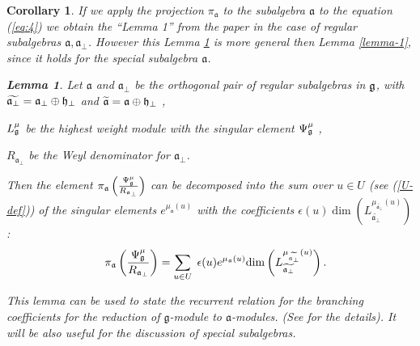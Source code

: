 \documentclass[12pt]{article}
\newtheorem{corollary}{Corollary}[theorem]
\newtheorem{lemma}{Lemma}
\theoremstyle{definition}
\newcommand{\gf}{\mathfrak{g}}
\newcommand{\af}{\mathfrak{a}}
\newcommand{\afb}{\mathfrak{a}_{\bot}}
\begin{document}
\begin{corollary}
  \label{sec:corollary-1}
  If we apply the projection $\pi_{\af}$ to the subalgebra $\af$ to the equation (\ref{eq:4}) we obtain the ``Lemma 1'' from the paper \cite{2010arXiv1007.0318L} in the case of regular subalgebras $\af, \afb$. However this Lemma \ref{lemma-2} is more general then Lemma \ref{lemma-1}, since it holds for the special subalgebra $\af$.
\begin{lemma}
\label{lemma-2}
Let $\af$ and $\af_{\perp }$ be the orthogonal pair of regular
subalgebras in $\frak{g}$, with $\widetilde{\af_{\perp }}=\af%
_{\perp }\oplus \frak{h}_{\perp }$ and $\widetilde{\af}=\af\oplus
\frak{h}_{\perp }$ ,

$L_{\frak{g}}^{\mu }$ be the highest weight module with the singular element
$\Psi _{\frak{g}}^{\mu }$ ,

$R_{\af_{\perp }}$ be the Weyl denominator for $\af_{\perp }$.

Then the element $\pi _{\af}\left( \frac{\Psi _{\frak{g}}^{\mu }}{R_{%
\af_{\perp }}}\right) $ can be decomposed into the sum over $u\in U$ (see (\ref{U-def})) of
the singular elements $e^{\mu _{\af}\left( u\right) }$ with the
coefficients $\epsilon (u)\mathrm{\dim }\left( L_{\widetilde{\af_{\perp
}}}^{\mu _{\widetilde{\af_{\perp }}}\left( u\right) }\right) $:
\begin{equation}
\quad \pi _{\af}\left( \frac{\Psi _{\frak{g}}^{\mu }}{R_{\af%
_{\perp }}}\right) =\sum_{u\in U}\;\epsilon (u)e^{\mu _{\af}\left(
u\right) }\mathrm{\dim }\left( L_{\widetilde{\af_{\perp }}}^{\mu _{%
\widetilde{\af_{\perp }}}\left( u\right) }\right) .
\label{eq:11}
\end{equation}
\end{lemma}
This lemma can be used to state the recurrent relation for the branching coefficients for the reduction of $\gf$-module to $\af$-modules. (See \cite{2010arXiv1007.0318L} for the details). It will be also useful for the discussion of special subalgebras. 
\end{corollary}
\end{document}
